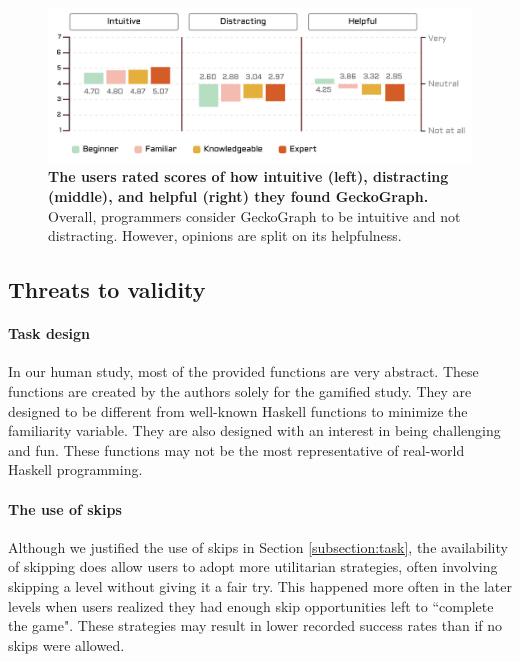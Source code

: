 \documentclass[preprint,12pt]{elsarticle}
\begin{document}

\begin{figure}[]
  \includegraphics[width=\linewidth]{figures/Qualitative}
  \caption{\label{fig:qualitative} {\bf The users rated scores of how intuitive (left), distracting (middle), and helpful (right) they found GeckoGraph.} Overall, programmers consider GeckoGraph to be intuitive and not distracting. However, opinions are split on its helpfulness. }
\end{figure}

\subsection{Threats to validity}

\paragraph{Task design}
In our human study, most of the provided functions are very abstract. These functions are created by the authors solely for the gamified study. They are designed to be different from well-known Haskell functions to minimize the familiarity variable. They are also designed with an interest in being challenging and fun. These functions may not be the most representative of real-world Haskell programming. 

\paragraph{The use of skips}
Although we justified the use of skips in Section \ref{subsection:task}, the availability of skipping does allow users to adopt more utilitarian strategies, often involving skipping a level without giving it a fair try. This happened more often in the later levels when users realized they had enough skip opportunities left to ``complete the game". These strategies may result in lower recorded success rates than if no skips were allowed.
\end{document}
